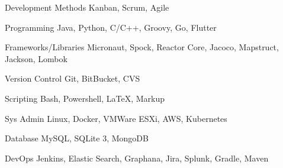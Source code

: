 
\begin{cvskills}

  \cvskill
    {Development Methods}
    {Kanban, Scrum, Agile}

  \cvskill
    {Programming}
    {Java, Python, C/C++, Groovy, Go, Flutter}

  \cvskill
    {Frameworks/Libraries}
    {Micronaut, Spock, Reactor Core, Jacoco, Mapstruct, Jackson, Lombok}

  \cvskill
    {Version Control}
    {Git, BitBucket, CVS}
    
  \cvskill
    {Scripting}
    {Bash, Powershell, LaTeX, Markup}

  \cvskill
    {Sys Admin}
    {Linux, Docker, VMWare ESXi, AWS, Kubernetes}
    
  \cvskill
    {Database}
    {MySQL, SQLite 3, MongoDB}
    
  \cvskill
    {DevOps}
    {Jenkins, Elastic Search, Graphana, Jira, Splunk, Gradle, Maven}
    


\end{cvskills}
